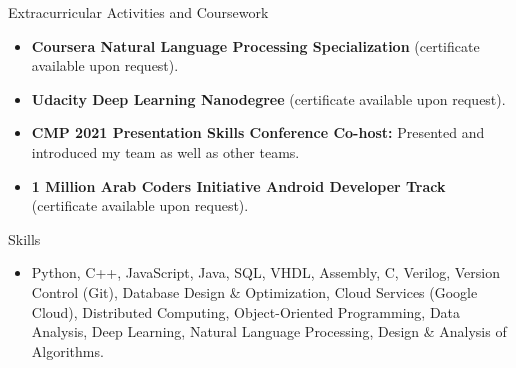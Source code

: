 \documentclass[]{mcdowellcv}
\begin{document}
	\begin{cvsection}{Extracurricular Activities and Coursework}
		\begin{cvsubsection}{}{}{}
			\begin{itemize}
				\item \textbf{Coursera Natural Language Processing Specialization} (certificate available upon request).
				\item \textbf{Udacity Deep Learning Nanodegree} (certificate available upon request).
				\item \textbf{CMP 2021 Presentation Skills Conference Co-host:} Presented and introduced my team as well as other teams.
				\item \textbf{1 Million Arab Coders Initiative Android Developer Track} (certificate available upon request).
			\end{itemize}
		\end{cvsubsection}
	\end{cvsection}
	
	\begin{cvsection}{Skills}
		\begin{cvsubsection}{}{}{}
			\begin{itemize}
				\item Python, C++, JavaScript, Java, SQL, VHDL, Assembly, C, Verilog, Version Control (Git), Database Design \& Optimization, Cloud Services (Google Cloud), Distributed Computing, Object-Oriented Programming, Data Analysis, Deep Learning, Natural Language Processing, Design \& Analysis of Algorithms.
			\end{itemize}
		\end{cvsubsection}
	\end{cvsection}
	
\end{document}
